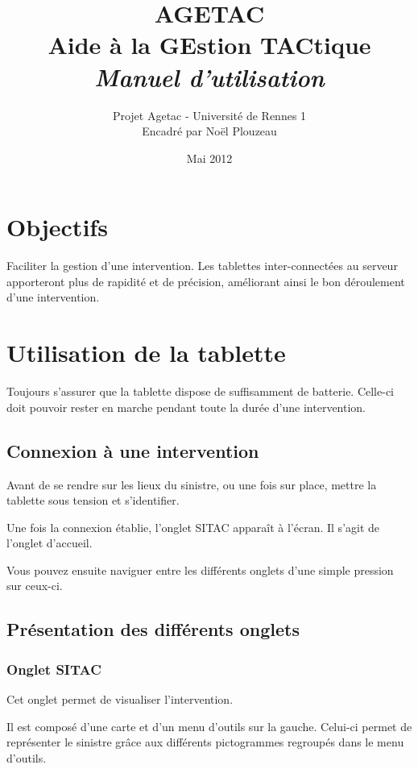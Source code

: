 \documentclass{article}
\title{\Huge{AGETAC\\
Aide à la GEstion TACtique\\}
\huge{{\color{color02} \textit{Manuel d'utilisation}}}}
\date{Mai 2012}
\author{Projet Agetac - Université de Rennes 1\\
Encadré par Noël Plouzeau}
\begin{document}
\maketitle
\vspace{1.1in}
\tableofcontents
\newpage
 \section{Objectifs}

Faciliter la gestion d'une intervention. Les tablettes inter-connectées 
au serveur apporteront plus de rapidité et de précision, améliorant ainsi le 
bon déroulement d'une intervention.

\section{Utilisation de la tablette}

Toujours s'assurer que la tablette dispose de suffisamment de 
batterie. Celle-ci doit pouvoir rester en marche pendant toute la durée d'une 
intervention.

\subsection{Connexion à une intervention}

Avant de se rendre sur les lieux du sinistre, ou une fois sur 
place, mettre la tablette sous tension et s'identifier.

Une fois la connexion établie, l'onglet SITAC apparaît à l'écran. 
Il s'agit de l'onglet d'accueil.

Vous pouvez ensuite naviguer entre les différents onglets d'une 
simple pression sur ceux-ci.

\subsection{Présentation des différents onglets}

\subsubsection{Onglet SITAC}

Cet onglet permet de visualiser l'intervention.

Il est composé d'une carte et d'un menu d'outils sur la gauche. 
Celui-ci permet de représenter le sinistre grâce aux différents pictogrammes 
regroupés dans le menu d'outils.
\end{document}
